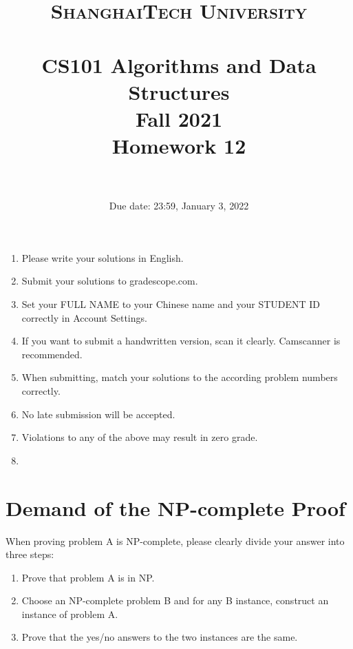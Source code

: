 \documentclass{article}
\title{
	\normalfont \normalsize
	\textsc{ShanghaiTech University} \\ [25pt]
	\horrule{0.5pt} \\[0.4cm] %
	\huge CS101 Algorithms and Data Structures\\ %
	\LARGE Fall 2021\\
	\LARGE Homework 12\\
	\horrule{2pt} \\[0.5cm] %
}
\author{}
\date{Due date: 23:59, January 3, 2022}
\begin{document}
\maketitle
\thispagestyle{firstpage}
\vspace{3ex}

\begin{enumerate}
	\item Please write your solutions in English.

	\item Submit your solutions to gradescope.com.

	\item Set your FULL NAME to your Chinese name and your STUDENT ID correctly in Account Settings.

	\item If you want to submit a handwritten version, scan it clearly. Camscanner is recommended.

	\item When submitting, match your solutions to the according problem numbers correctly.

	\item No late submission will be accepted.

	\item Violations to any of the above may result in zero grade.

	\item {\large\color{red}{In this homework, all the proofs need three steps. The demands and an example are given on the next page. If you do not organize your answer in the standard format, you will not get any point.}}
\end{enumerate}
\newpage
\section*{Demand of the NP-complete Proof}
When proving problem A is NP-complete, please clearly divide your answer into three steps:
\begin{enumerate}

	\item Prove that problem A is in NP.

	\item Choose an NP-complete problem B and for any B instance, construct an instance of problem A.

	\item Prove that the yes/no answers to the two instances are the same.
\end{enumerate}
\end{document}
